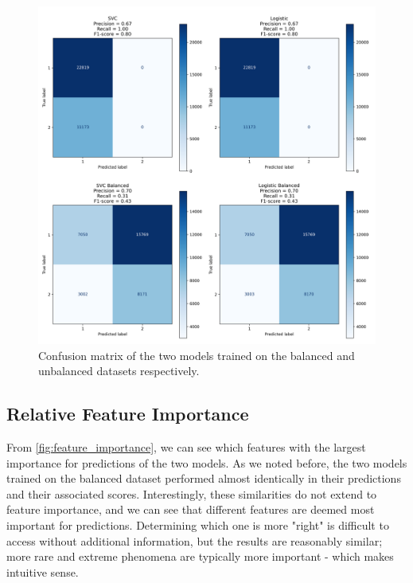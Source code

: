 \documentclass[12pt,a4paper,oneside]{article}
\begin{document}
\begin{figure}[htpb!]
    \centering
    \caption{Confusion matrix of the two models trained on the balanced and unbalanced datasets respectively.}
    \label{fig:confusion_matrix}
    \includegraphics[width=\textwidth]{confusion_matrix.png}
\end{figure}

\subsection{Relative Feature Importance} 

From \ref{fig:feature_importance}, we can see which features with the largest importance for predictions of the two models. As we noted before, the two models trained on the balanced dataset performed almost identically in their predictions and their associated scores. Interestingly, these similarities do not extend to feature importance, and we can see that different features are deemed most important for predictions. Determining which one is more "right" is difficult to access without additional information, but the results are reasonably similar; more rare and extreme phenomena are typically more important - which makes intuitive sense. 
\end{document}
